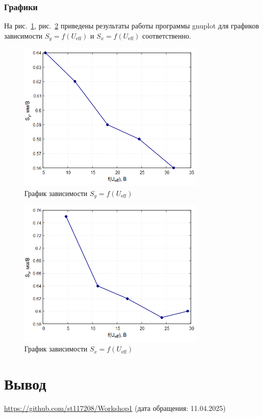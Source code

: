 \subsubsection{Графики}

На рис.~\ref{fig:plot1}, рис.~\ref{fig:plot2} приведены результаты работы программы gnuplot для графиков зависимости $S_y = f(U_{\text{eff}})$ и $S_x = f(U_{\text{eff}})$ соответственно.

\begin{figure}[H]
\centering
\includegraphics[width=0.8\textwidth]{plot1.png}
\caption{График зависимости $S_y = f(U_{\text{eff}})$}
\label{fig:plot1}
\end{figure}

\begin{figure}[H]
\centering
\includegraphics[width=0.8\textwidth]{plot2.png}
\caption{График зависимости $S_x = f(U_{\text{eff}})$}
\label{fig:plot2}
\end{figure}

\section{Вывод}


\begin{thebibliography}{9}
\url{https://github.com/st117208/Workshop1}  (дата обращения: 11.04.2025)
\end{thebibliography}